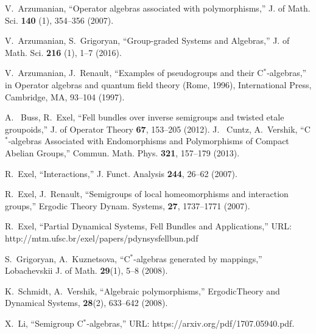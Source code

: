 \documentclass[
11pt,%
tightenlines,%
twoside,%
onecolumn,%
nofloats,%
nobibnotes,%
nofootinbib,%
superscriptaddress,%
noshowpacs,%
centertags]%
{revtex4}
\begin{document}
\begin{thebibliography}{20}
         V.~Arzumanian,  ``Operator algebras associated with polymorphisms,'' J. of Math. Sci. \textbf{140} (1), 354--356 (2007).

     V.~Arzumanian, S.~Grigoryan,  ``Group-graded Systems and Algebras,'' J. of Math. Sci. \textbf{216} (1), 1--7 (2016).

     V.~Arzumanian, J.~Renault,   ``Examples of pseudogroups and their C$^*$-algebras,''
    in Operator algebras and quantum field theory (Rome, 1996), International Press, Cambridge, MA, 93--104 (1997).

     A.~ Buss, R.~Exel,  ``Fell bundles over inverse semigroups and twisted etale groupoids,''  J. of Operator Theory   \textbf{67}, 153--205 (2012).
     J.~ Cuntz, A.~Vershik,   ``C$^*$-algebras Associated with Endomorphisms and Polymorphisms of Compact Abelian Groups,''
    Commun. Math. Phys. \textbf{321}, 157--179 (2013).

     R.~Exel, ``Interactions,'' J. Funct. Analysis \textbf{244}, 26--62 (2007).

         R.~Exel, J.~Renault, ``Semigroups of local homeomorphisms and
        interaction groups,'' Ergodic Theory Dynam. Systems, \textbf{27}, 1737--1771 (2007).

         R.~Exel, ``Partial Dynamical Systems, Fell Bundles and Applications,'' URL: http://mtm.ufsc.br/exel/papers/pdynsysfellbun.pdf

    S.~Grigoryan, A.~Kuznetsova, ``C$^{*}$-algebras generated by mappings,''
    Lobachevskii J. of Math. \textbf{29}(1), 5--8 (2008).

    K.~Schmidt, A.~Vershik, ``Algebraic polymorphisms,''  ErgodicTheory and Dynamical Systems, \textbf{28}(2), 633--642 (2008).

     X.~Li, ``Semigroup {\rm C}$^*$-algebras,'' URL: https://arxiv.org/pdf/1707.05940.pdf.

\end{thebibliography}
\end{document}
